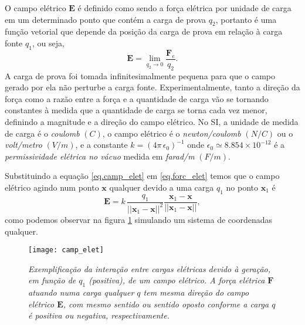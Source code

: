 O campo elétrico $\textbf{E}$ é definido como sendo a força elétrica por unidade de carga em um determinado ponto que contém a carga de prova $q_2$, portanto é uma função vetorial que depende da posição da carga de prova em relação à carga fonte $q_1$, ou seja,
\begin{equation}\label{eq.camp_elet}
\textbf{E}=\lim_{q_2\to 0}\frac{\textbf{F}_e}{q_2}.
\end{equation}
A carga de prova foi tomada infinitesimalmente pequena para que o campo gerado por ela não perturbe a carga fonte. Experimentalmente, tanto a direção da força como a razão entre a força e a quantidade de carga vão se tornando constantes à medida que a quantidade de carga se torna cada vez menor, definindo a magnitude e a direção do campo elétrico. No SI, a unidade de medida de carga é o \textit{coulomb} $(C)$, o campo elétrico é o \textit{newton/coulomb} $(N/C)$ ou o \textit{volt/metro} $(V/m)$, e a constante $k=(4\pi\,\epsilon_0)^{-1}$ onde $\epsilon_0\simeq8.854\times10^{-12}$ é a \textit{permissividade elétrica no vácuo} medida em \textit{farad/m} $(F/m)$.

Substituindo a equação \ref{eq.camp_elet} em \ref{eq.forc_elet} temos que o campo elétrico agindo num ponto $\textbf{x}$ qualquer devido a uma carga $q_1$ no ponto $\textbf{x}_1$ é
\begin{equation}\label{eq.campo_eletrico}
\textbf{E}=k\,\frac{q_1}{||\textbf{x}_1-\textbf{x}||^2}\frac{\textbf{x}_1-\textbf{x}}{||\textbf{x}_1-\textbf{x}||},
\end{equation}
como podemos observar na figura \ref{fig.camp_eletr} simulando um sistema de coordenadas qualquer.
\begin{figure}[!htb]
\centering
\texttt{[image: camp\_elet]}
\caption{\textit{Exemplificação da interação entre cargas elétricas devido à geração, em função de $q_1$ (positiva), de um campo elétrico. A força elétrica $\textbf{F}$ atuando numa carga qualquer $q$ tem mesma direção do campo elétrico $\textbf{E}$, com mesmo sentido ou sentido oposto conforme a carga $q$ é positiva ou negativa, respectivamente.}}
\label{fig.camp_eletr}
\end{figure}


